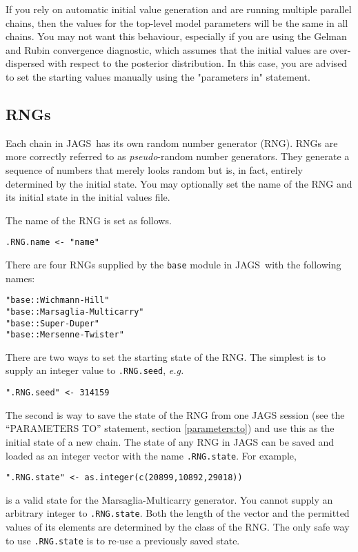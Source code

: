 \documentclass[11pt, a4paper, titlepage]{report}
\newcommand{\JAGS}{\textsf{JAGS}}
\begin{document}
If you rely on automatic initial value generation and are running
multiple parallel chains, then the values for the top-level model
parameters will be the same in all chains.  You may not want this
behaviour, especially if you are using the Gelman and Rubin convergence
diagnostic, which assumes that the initial values are over-dispersed
with respect to the posterior distribution. In this case, you are
advised to set the starting values manually using the "parameters in"
statement.

\subsection{RNGs}
\label{section:rngs}

Each chain in \JAGS\ has its own random number generator (RNG). RNGs
are more correctly referred to as {\em pseudo}-random number
generators. They generate a sequence of numbers that merely looks
random but is, in fact, entirely determined by the initial state.  You
may optionally set the name of the RNG and its initial state in the
initial values file.

The name of the RNG is set as follows. 
\begin{verbatim}
.RNG.name <- "name"
\end{verbatim}
There are four RNGs supplied by the \texttt{base} module in \JAGS\
with the following names:
\begin{verbatim}
"base::Wichmann-Hill"
"base::Marsaglia-Multicarry"
"base::Super-Duper"
"base::Mersenne-Twister"
\end{verbatim}

There are two ways to set the starting state of the RNG. The simplest
is to supply an integer value to \texttt{.RNG.seed}, {\em e.g.}
\begin{verbatim}
".RNG.seed" <- 314159
\end{verbatim}
The second is way to save the state of the RNG from one JAGS session
(see the ``PARAMETERS TO'' statement, section \ref{parameters:to}) and
use this as the initial state of a new chain. The state of any RNG in
JAGS can be saved and loaded as an integer vector with the name
\texttt{.RNG.state}. For example,
\begin{verbatim}
".RNG.state" <- as.integer(c(20899,10892,29018))
\end{verbatim}
is a valid state for the Marsaglia-Multicarry generator.  You cannot
supply an arbitrary integer to \texttt{.RNG.state}. Both the length of
the vector and the permitted values of its elements are determined by
the class of the RNG. The only safe way to use \texttt{.RNG.state} is
to re-use a previously saved state.
\end{document}
